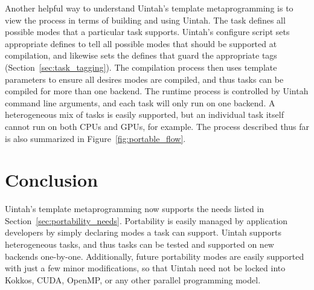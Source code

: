 \documentclass[]{article}
\begin{document}
Another helpful way to understand Uintah's template metaprogramming  is to view the process in terms of building and using Uintah.  The task defines all possible modes that a particular task supports.  Uintah's configure script sets appropriate defines to tell all possible modes that should be supported at compilation, and likewise sets the defines that guard the appropriate tags (Section~\ref{sec:task_tagging}).  The compilation process then uses template parameters to ensure all desires modes are compiled, and thus tasks can be compiled for more than one backend.  The runtime process is controlled by Uintah command line arguments, and each task will only run on one backend.  A heterogeneous mix of tasks is easily supported, but an individual task itself cannot run on both CPUs and GPUs, for example.  The process described thus far is also summarized in Figure~\ref{fig:portable_flow}.

\section{Conclusion}

Uintah's template metaprogramming now supports the needs listed in Section~\ref{sec:portability_needs}.  Portability is easily managed by application developers by simply declaring modes a task can support.  Uintah supports heterogeneous tasks, and thus tasks can be tested and supported on new backends one-by-one.  Additionally, future portability modes are easily supported with just a few minor modifications, so that Uintah need not be locked into Kokkos, CUDA, OpenMP, or any other parallel programming model. 
\end{document}
